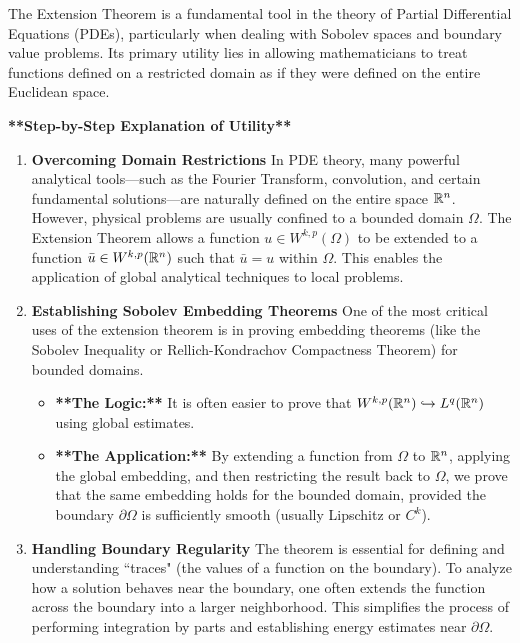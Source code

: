 \documentclass[12pt,a4paper]{report}
\begin{document}
\begin{description}
The Extension Theorem is a fundamental tool in the theory of Partial Differential Equations (PDEs), particularly when dealing with Sobolev spaces and boundary value problems. Its primary utility lies in allowing mathematicians to treat functions defined on a restricted domain as if they were defined on the entire Euclidean space.

\textbf{**Step-by-Step Explanation of Utility**}
\begin{enumerate}

\item \textbf{ Overcoming Domain Restrictions}
In PDE theory, many powerful analytical tools—such as the Fourier Transform, convolution, and certain fundamental solutions—are naturally defined on the entire space $\mathbb{R}^n$. However, physical problems are usually confined to a bounded domain $\Omega$. The Extension Theorem allows a function $u \in W^{k,p}(\Omega)$ to be extended to a function $\bar{u} \in W^{k,p}(\mathbb{R}^n)$ such that $\bar{u} = u$ within $\Omega$. This enables the application of global analytical techniques to local problems.

\item  \textbf{Establishing Sobolev Embedding Theorems}
One of the most critical uses of the extension theorem is in proving embedding theorems (like the Sobolev Inequality or Rellich-Kondrachov Compactness Theorem) for bounded domains.
\begin{itemize}

\item \textbf{**The Logic:**} It is often easier to prove that $W^{k,p}(\mathbb{R}^n) \hookrightarrow L^q(\mathbb{R}^n)$ using global estimates.
\item \textbf{**The Application:**} By extending a function from $\Omega$ to $\mathbb{R}^n$, applying the global embedding, and then restricting the result back to $\Omega$, we prove that the same embedding holds for the bounded domain, provided the boundary $\partial\Omega$ is sufficiently smooth (usually Lipschitz or $C^k$).
\end{itemize}

\item \textbf{ Handling Boundary Regularity}
The theorem is essential for defining and understanding ``traces" (the values of a function on the boundary). To analyze how a solution behaves near the boundary, one often extends the function across the boundary into a larger neighborhood. This simplifies the process of performing integration by parts and establishing energy estimates near $\partial\Omega$.


\end{enumerate}
\end{description}
\end{document}
